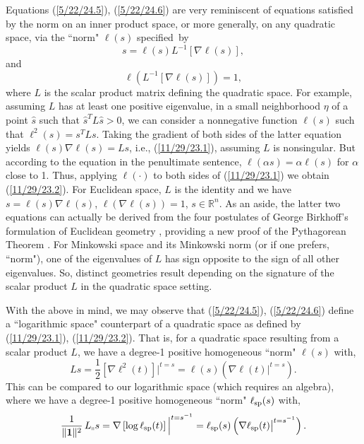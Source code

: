 \documentclass{amsart}
\numberwithin{equation}{section}
\theoremstyle{definition}
\numberwithin{theorem}{section}
\begin{document}
Equations (\ref{5/22/24.5}), (\ref{5/22/24.6}) are very reminiscent of equations satisfied by the norm on an inner product space, or more generally, on any quadratic space, via the ``norm" $\ell(s)$ \mbox{specified by} \begin{equation}\label{11/29/23.1} s = \ell(s)L^{-1}[\nabla\ell(s)],\end{equation} and \begin{equation}\label{11/29/23.2}\ell\left(L^{-1}[\nabla\ell(s)]\right) = 1,\end{equation} where $L$ is the scalar product matrix defining the quadratic space. For example, assuming $L$ has at least one positive eigenvalue, in a small neighborhood $\eta$ of a point $\hat{s}$ such that $\hat{s}^T L \hat{s} >0$, we can consider a nonnegative function $\ell(s)$ such that \mbox{$\ell^2(s)= s^TLs$}.  Taking the gradient of both sides of the latter equation yields $\ell(s) \nabla\ell(s)=Ls$, i.e., (\ref{11/29/23.1}), assuming $L$ is nonsingular.  But according to the equation in the penultimate sentence, $\ell(\alpha s) = \alpha\ell(s)$ for $\alpha$ close to 1.  Thus, applying $\ell(\cdot)$ to both sides of (\ref{11/29/23.1}) we obtain (\ref{11/29/23.2}).  
For Euclidean space, $L$ is the identity and we have $s=\ell(s)\nabla \ell(s)$, $\ell\left(\nabla \ell(s)\right) = 1$, $s\in \mathbb{R}^n$.  As an aside, the latter two equations can actually be derived from the four postulates of George Birkhoff's formulation of Euclidean geometry \cite{birkhoff:1932}, providing a new proof of the Pythagorean Theorem \cite{fgreensite:2022b}.  For Minkowski space and its Minkowski norm (or if one prefers, ``norm"), one of the eigenvalues of $L$ has sign opposite to the sign of all other eigenvalues.
So, distinct geometries result depending on the signature of the scalar product $L$ in the quadratic space setting.  

With the above in mind, we may observe that (\ref{5/22/24.5}), (\ref{5/22/24.6}) define a \mbox{``logarithmic} space" counterpart of a quadratic space as defined by (\ref{11/29/23.1}), (\ref{11/29/23.2}).  That is, for a quadratic space resulting from a scalar product $L$, we have a degree-1 positive homogeneous ``norm" $\ell(s)$ with, \[ Ls = \frac{1}{2}\left[\nabla\ell^2(t)\right]\Big|^{t=s} = \ell(s)\left(\nabla\ell(t)\big|^{t=s}\right).\]  This can be compared to our logarithmic space (which requires an algebra), where we have a degree-1 positive homogeneous ``norm" $\ell_{\rm sp}(s)$ with, \[\frac{1}{\|\mathbf{1}\|^2}\,L_{\shortparallel} s = \nabla\left[\log\ell_{\rm sp}(t)\right]\Big|^{t=s^{-1}} = \ell_{\rm sp}(s)\left(\nabla\ell_{\rm sp}(t)\big|^{t=s^{-1}}\right).\]  
\end{document}
